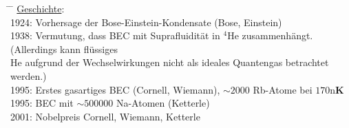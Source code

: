 \begin{tabbing}
\hspace{4em} \= \hspace{4em} \= \kill
\underline{Geschichte}:\\
1924:\> Vorhersage der Bose-Einstein-Kondensate (Bose, Einstein)\\
1938:\> Vermutung, dass BEC mit Suprafluidität in $^4$He zusammenhängt. (Allerdings kann flüssiges\\\> He aufgrund der Wechselwirkungen nicht als ideales Quantengas betrachtet werden.)\\
1995:\> Erstes gasartiges BEC (Cornell, Wiemann), $\sim 2000$ Rb-Atome bei $170 \text{n}\textbf{K}$\\
1995:\> BEC mit $\sim 500 000$ Na-Atomen (Ketterle)\\
2001:\> Nobelpreis Cornell, Wiemann, Ketterle\\
\end{tabbing}


